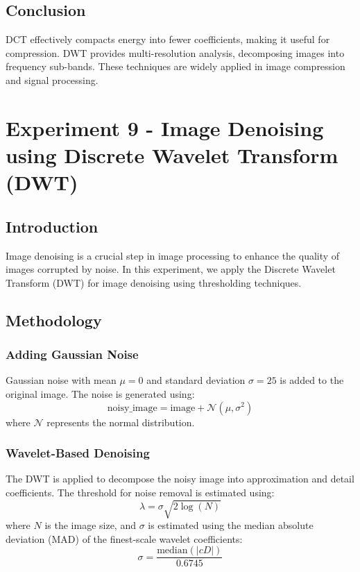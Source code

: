 \documentclass{report}
\begin{document}
\section{Conclusion}
DCT effectively compacts energy into fewer coefficients, making it useful for compression. DWT provides multi-resolution analysis, decomposing images into frequency sub-bands. These techniques are widely applied in image compression and signal processing.

\chapter{Experiment 9 - Image Denoising using Discrete Wavelet Transform (DWT)}

\section{Introduction}
Image denoising is a crucial step in image processing to enhance the quality of images corrupted by noise. In this experiment, we apply the Discrete Wavelet Transform (DWT) for image denoising using thresholding techniques.

\section{Methodology}

\subsection{Adding Gaussian Noise}
Gaussian noise with mean $\mu=0$ and standard deviation $\sigma=25$ is added to the original image. The noise is generated using:
\begin{equation}
\text{noisy\_image} = \text{image} + \mathcal{N}(\mu, \sigma^2)
\end{equation}
where $\mathcal{N}$ represents the normal distribution.

\subsection{Wavelet-Based Denoising}
The DWT is applied to decompose the noisy image into approximation and detail coefficients. The threshold for noise removal is estimated using:
\begin{equation}
\lambda = \sigma \sqrt{2 \log(N)}
\end{equation}
where $N$ is the image size, and $\sigma$ is estimated using the median absolute deviation (MAD) of the finest-scale wavelet coefficients:
\begin{equation}
\sigma = \frac{\text{median}(|cD|)}{0.6745}
\end{equation}
\end{document}
